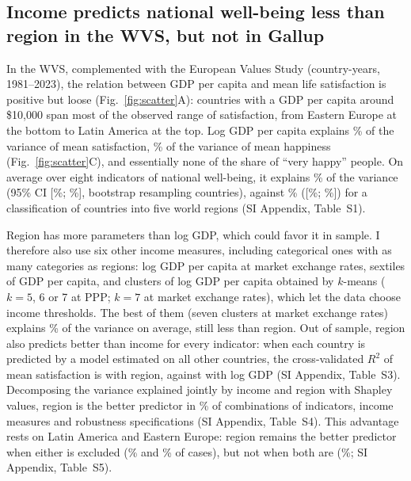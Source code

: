 \documentclass[10pt]{article}
\providecommand{\SIref}[3]{#2}
\begin{document}
\subsection*{Income predicts national well-being less than region in the WVS, but not in Gallup}

In the WVS, complemented with the European Values Study (\nWVSCountryYears country-years, 1981--2023), the relation between GDP per capita and mean life satisfaction is positive but loose (Fig.~\ref{fig:scatter}A): countries with a GDP per capita around \$10,000 span most of the observed range of satisfaction, from Eastern Europe at the bottom to Latin America at the top. Log GDP per capita explains \RtwoSatisfiedMeanPPP\% of the variance of mean satisfaction, \RtwoHappinessMeanPPP\% of the variance of mean happiness (Fig.~\ref{fig:scatter}C), and essentially none of the share of ``very happy'' people. On average over eight indicators of national well-being, it explains \meanRtwoIncomePPP\% of the variance (95\% CI [\ciLowWVSMeanRIncome\%; \ciHighWVSMeanRIncome\%], bootstrap resampling countries), against \meanRtwoRegion\% ([\ciLowWVSMeanRRegion\%; \ciHighWVSMeanRRegion\%]) for a classification of countries into five world regions (SI Appendix, Table~\SIref{tab:r2_income}{S1}{Results}).

Region has more parameters than log GDP, which could favor it in sample. I therefore also use six other income measures, including categorical ones with as many categories as regions: log GDP per capita at market exchange rates, sextiles of GDP per capita, and clusters of log GDP per capita obtained by $k$-means ($k = 5$, 6 or 7 at PPP; $k = 7$ at market exchange rates), which let the data choose income thresholds. The best of them (seven clusters at market exchange rates) explains \meanRtwoIncomeBest\% of the variance on average, still less than region. Out of sample, region also predicts better than income for every indicator: when each country is predicted by a model estimated on all other countries, the cross-validated $R^2$ of mean satisfaction is \cvRegionSatisfiedMean with region, against \cvIncomeSatisfiedMean with log GDP (SI Appendix, Table~\SIref{tab:cv}{S3}{Results}). Decomposing the variance explained jointly by income and region with Shapley values, region is the better predictor in \shareRegionBetterWVS\% of \nSpecsWVS combinations of indicators, income measures and robustness specifications (SI Appendix, Table~\SIref{tab:robustness}{S4}{Results}). This advantage rests on Latin America and Eastern Europe: region remains the better predictor when either is excluded (\shareRegionBetterNoLatam\% and \shareRegionBetterNoEE\% of cases), but not when both are (\shareRegionBetterNoLatamEE\%; SI Appendix, Table~\SIref{tab:region_classifications}{S5}{Results}).
\end{document}
